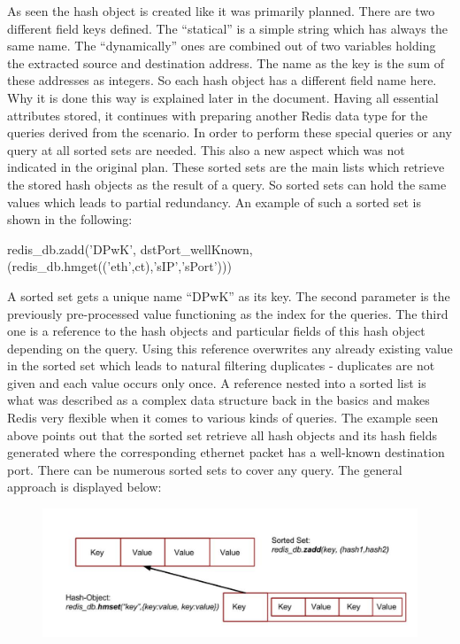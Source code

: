 As seen the hash object is created like it was primarily planned. There are two different field keys defined. The “statical” is a simple string which has always the same name. The “dynamically” ones are combined out of two variables holding the extracted source and destination address. The name as the key is the sum of these addresses as integers. So each hash object has a different field name here. Why it is done this way is explained later in the document. 
Having all essential attributes stored, it continues with preparing another Redis data type for the queries derived from the scenario. In order to perform these special queries or any query at all sorted sets are needed. This also a new aspect which was not indicated in the original plan. These sorted sets are the main lists which retrieve the stored hash objects as the result of a query. So sorted sets can hold the same values which leads to partial redundancy. An example of such a sorted set is shown in the following:

redis_db.zadd('DPwK', dstPort_wellKnown,(redis_db.hmget(('eth',ct),'sIP','sPort')))

A sorted set gets a unique name “DPwK” as its key. The second parameter is the previously pre-processed value functioning as the index for the queries. The third one is a reference to the hash objects and particular fields of this hash object depending on the query. Using this reference overwrites any already existing value in the sorted set which leads to natural filtering duplicates - duplicates are not given and each value occurs only once. A reference nested into a sorted list is what was described as a complex data structure back in the basics and makes Redis very flexible when it comes to various kinds of queries. The example seen above points out that the sorted set retrieve all hash objects and its hash fields generated where the corresponding ethernet packet has a well-known destination port. There can be numerous sorted sets to cover any query. The general approach is displayed below:

\begin{figure}[htb!]
	\centerline{\includegraphics[width=1.0\textwidth]{resources/solution3-2.png}}
\end{figure}

